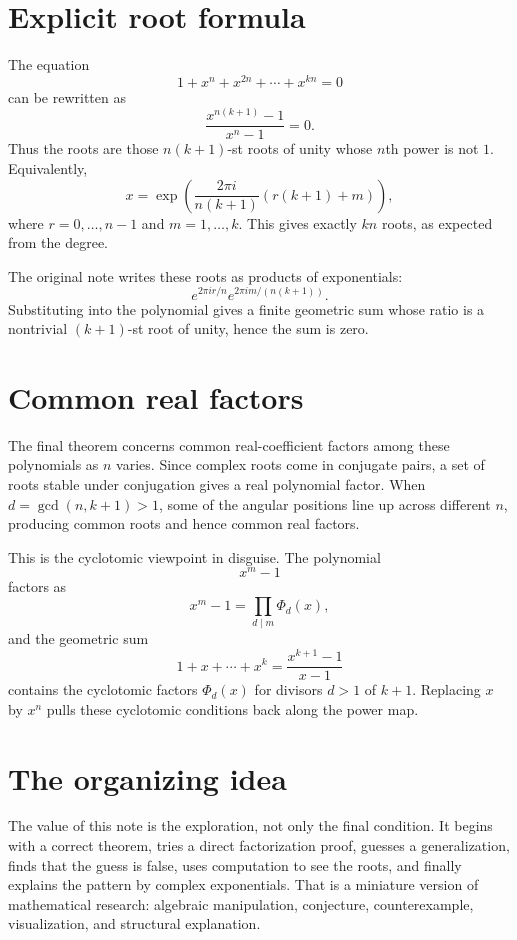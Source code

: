 \section{Explicit root formula}

The equation
\[
  1+x^n+x^{2n}+\cdots+x^{kn}=0
\]
can be rewritten as
\[
  \frac{x^{n(k+1)}-1}{x^n-1}=0.
\]
Thus the roots are those $n(k+1)$-st roots of unity whose $n$th power is not $1$.  Equivalently,
\[
  x=\exp\left(\frac{2\pi i}{n(k+1)}(r(k+1)+m)\right),
\]
where $r=0,\ldots,n-1$ and $m=1,\ldots,k$.  This gives exactly $kn$ roots, as expected from the degree.

The original note writes these roots as products of exponentials:
\[
  e^{2\pi i r/n}e^{2\pi i m/(n(k+1))}.
\]
Substituting into the polynomial gives a finite geometric sum whose ratio is a nontrivial $(k+1)$-st root of unity, hence the sum is zero.

\section{Common real factors}

The final theorem concerns common real-coefficient factors among these polynomials as $n$ varies.  Since complex roots come in conjugate pairs, a set of roots stable under conjugation gives a real polynomial factor.  When $d=\gcd(n,k+1)>1$, some of the angular positions line up across different $n$, producing common roots and hence common real factors.

This is the cyclotomic viewpoint in disguise.  The polynomial
\[
  x^m-1
\]
factors as
\[
  x^m-1=\prod_{d\mid m}\Phi_d(x),
\]
and the geometric sum
\[
  1+x+\cdots+x^k=\frac{x^{k+1}-1}{x-1}
\]
contains the cyclotomic factors $\Phi_d(x)$ for divisors $d>1$ of $k+1$.  Replacing $x$ by $x^n$ pulls these cyclotomic conditions back along the power map.

\section{The organizing idea}

The value of this note is the exploration, not only the final condition.  It begins with a correct theorem, tries a direct factorization proof, guesses a generalization, finds that the guess is false, uses computation to see the roots, and finally explains the pattern by complex exponentials.  That is a miniature version of mathematical research: algebraic manipulation, conjecture, counterexample, visualization, and structural explanation.

